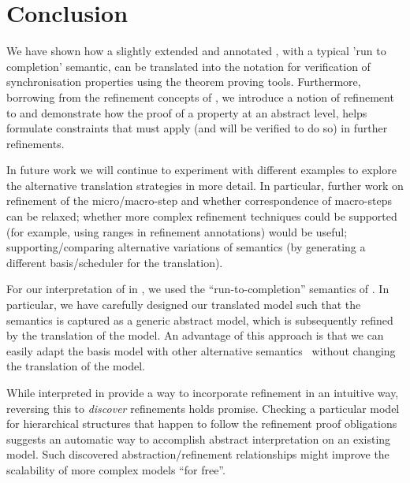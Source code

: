 
\section{Conclusion}
\label{sec:conclusion}
We have shown how a slightly extended and annotated \statechart, with a typical 'run to completion' semantic, can be translated into the \EventB notation for verification of synchronisation properties using the \EventB theorem proving tools.
Furthermore, borrowing from the refinement concepts of \EventB, we introduce a notion of refinement to \statecharts and demonstrate how the proof of a property at an abstract level, helps formulate constraints that must apply (and will be verified to do so) in further refinements.

In future work we will continue to experiment with different examples to explore the alternative translation strategies in more detail. 
In particular, further work on refinement of the micro/macro-step and whether correspondence of macro-steps can be relaxed; whether more complex refinement techniques could be supported (for example, using ranges in refinement annotations) would be useful; supporting/comparing alternative variations of semantics (by generating a different basis/scheduler for the translation).

For our interpretation of \statecharts in \mbox{\iUMLB}, we used the ``run-to-completion'' semantics of \statecharts.  In particular, we have carefully designed our translated model such that the semantics is captured as a generic abstract model, which is subsequently refined by the translation of the \SCXML model.  An advantage of this approach is that we can easily adapt the basis model with other alternative semantics~\mbox{\cite{Eshuis_2009}} without changing the translation of the \SCXML model. 

While \statecharts interpreted in \iUMLB provide a way to incorporate refinement in an intuitive way, reversing this to \emph{discover} refinements holds promise. 
Checking a particular \statechart model for hierarchical structures that happen to follow the refinement proof obligations suggests an automatic way to accomplish abstract interpretation on an existing model.  
Such discovered abstraction/refinement relationships might improve the scalability of more complex \statechart models ``for free''.
